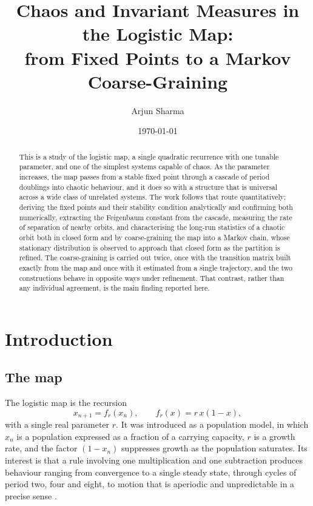 \documentclass[11pt,a4paper]{article}
\title{Chaos and Invariant Measures in the Logistic Map:\\
       from Fixed Points to a Markov Coarse-Graining}
\author{{Arjun Sharma}}
\date{\today}
\theoremstyle{definition}
\theoremstyle{remark}
\newcommand{\logmap}{f_r}
\begin{document}
\maketitle

\begin{abstract}
\noindent
This is a study of the logistic map, a single quadratic recurrence with one
tunable parameter, and one of the simplest systems capable of chaos. As the
parameter increases, the map passes from a stable fixed point through a
cascade of period doublings into chaotic behaviour, and it does so with a
structure that is universal across a wide class of unrelated systems. The work
follows that route quantitatively: deriving the fixed points and their
stability condition analytically and confirming both numerically, extracting
the Feigenbaum constant from the cascade, measuring the rate of separation of
nearby orbits, and characterising the long-run statistics of a chaotic orbit
both in closed form and by coarse-graining the map into a Markov chain, whose
stationary distribution is observed to approach that closed form as the
partition is refined. The coarse-graining is carried out twice, once
with the transition matrix built exactly from the map and once with it
estimated from a single trajectory, and the two constructions behave in
opposite ways under refinement. That contrast, rather than any individual
agreement, is the main finding reported here.
\end{abstract}

\tableofcontents

\bigskip

\section{Introduction}

\subsection{The map}

The logistic map is the recursion
\begin{equation}
  x_{n+1} = \logmap(x_n), \qquad \logmap(x) = r\,x(1-x),
  \label{eq:map}
\end{equation}
with a single real parameter $r$. It was introduced as a population model, in
which $x_n$ is a population expressed as a fraction of a carrying capacity,
$r$ is a growth rate, and the factor $(1-x_n)$ suppresses growth as the
population saturates. Its interest is that a rule involving one multiplication
and one subtraction produces behaviour ranging from convergence to a single
steady state, through cycles of period two, four and eight, to motion that is
aperiodic and unpredictable in a precise sense \cite{May1976,Strogatz2015}.
\end{document}
